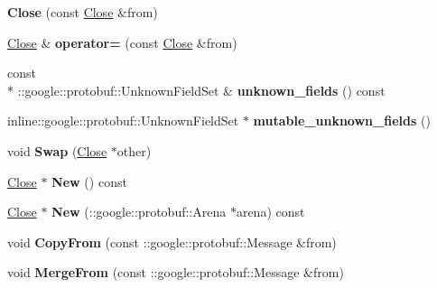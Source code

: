 \begin{DoxyCompactItemize}
\item 
\hypertarget{class_close_a3cf170e3bce53793243f8459409307b7}{{\bfseries Close} (const \hyperlink{class_close}{Close} \&from)}\label{class_close_a3cf170e3bce53793243f8459409307b7}

\item 
\hypertarget{class_close_a1b25cdc167aee37d7a8309b04d077bad}{\hyperlink{class_close}{Close} \& {\bfseries operator=} (const \hyperlink{class_close}{Close} \&from)}\label{class_close_a1b25cdc167aee37d7a8309b04d077bad}

\item 
\hypertarget{class_close_a5be69c428eb1703c4d80eea28c292d29}{const \\*
\-::google\-::protobuf\-::\-Unknown\-Field\-Set \& {\bfseries unknown\-\_\-fields} () const }\label{class_close_a5be69c428eb1703c4d80eea28c292d29}

\item 
\hypertarget{class_close_ae28750281fa411c3c3f8f48caf424ab6}{inline\-::google\-::protobuf\-::\-Unknown\-Field\-Set $\ast$ {\bfseries mutable\-\_\-unknown\-\_\-fields} ()}\label{class_close_ae28750281fa411c3c3f8f48caf424ab6}

\item 
\hypertarget{class_close_aa03838e3abc80695ba93ef7739d7d9fc}{void {\bfseries Swap} (\hyperlink{class_close}{Close} $\ast$other)}\label{class_close_aa03838e3abc80695ba93ef7739d7d9fc}

\item 
\hypertarget{class_close_a863cee284bf4ba2e629e53322e79c218}{\hyperlink{class_close}{Close} $\ast$ {\bfseries New} () const }\label{class_close_a863cee284bf4ba2e629e53322e79c218}

\item 
\hypertarget{class_close_a93fd428d5681d636ca918d07e15d6550}{\hyperlink{class_close}{Close} $\ast$ {\bfseries New} (\-::google\-::protobuf\-::\-Arena $\ast$arena) const }\label{class_close_a93fd428d5681d636ca918d07e15d6550}

\item 
\hypertarget{class_close_a8b24eba0bd4d8ee9e6dc879941651748}{void {\bfseries Copy\-From} (const \-::google\-::protobuf\-::\-Message \&from)}\label{class_close_a8b24eba0bd4d8ee9e6dc879941651748}

\item 
\hypertarget{class_close_a94c8f74312a7d33986d44d5195815d2e}{void {\bfseries Merge\-From} (const \-::google\-::protobuf\-::\-Message \&from)}\label{class_close_a94c8f74312a7d33986d44d5195815d2e}


\end{DoxyCompactItemize}
